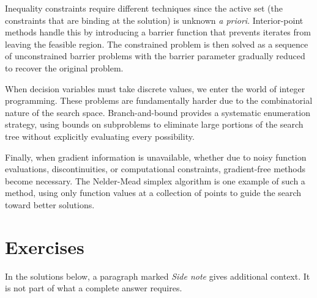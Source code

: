 Inequality constraints require different techniques since the active set (the constraints that are binding at the solution) is unknown \emph{a priori}. Interior-point methods handle this by introducing a barrier function that prevents iterates from leaving the feasible region. The constrained problem is then solved as a sequence of unconstrained barrier problems with the barrier parameter gradually reduced to recover the original problem.

When decision variables must take discrete values, we enter the world of integer programming. These problems are fundamentally harder due to the combinatorial nature of the search space. Branch-and-bound provides a systematic enumeration strategy, using bounds on subproblems to eliminate large portions of the search tree without explicitly evaluating every possibility.

Finally, when gradient information is unavailable, whether due to noisy function evaluations, discontinuities, or computational constraints, gradient-free methods become necessary. The Nelder-Mead simplex algorithm is one example of such a method, using only function values at a collection of points to guide the search toward better solutions.

\section{Exercises}

 In the solutions below, a paragraph marked \emph{Side note} gives additional context. It is not part of what a complete answer requires.

